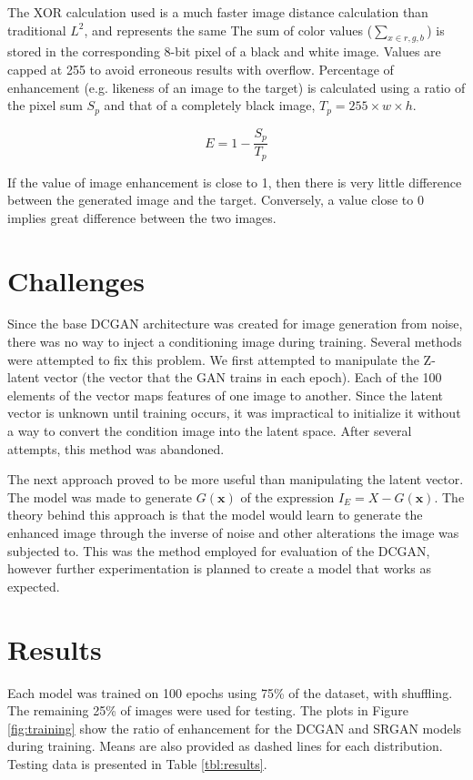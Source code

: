 \documentclass[letterpaper]{article} %
\begin{document}
The XOR calculation used is a much faster image distance calculation than
traditional $L^2$, and represents the same 
The sum of color values ($\sum_{x \in r,g,b}$) is stored in
the corresponding 8-bit pixel of a black and white image.
Values are capped at 255 to avoid erroneous results with overflow.
Percentage of enhancement (e.g. likeness of an image to the target)
is calculated using a ratio of the pixel sum $S_p$
and that of a completely black image, $T_p = 255 \times w \times h$.

\begin{equation}
\label{eq:enhancement}
E = 1 - \frac{S_p}{T_p}
\end{equation}

If the value of image enhancement
is close to 1, then there is very little difference between the generated
image and the target.
Conversely, a value close to 0 implies great difference between the two images.

\section{Challenges}
Since the base DCGAN architecture was created for image generation from noise,
there was no way to inject a conditioning image during training.
Several methods were attempted to fix this problem.
We first attempted to manipulate the Z-latent vector
(the vector that the GAN trains in each epoch).
Each of the 100 elements of the vector maps features of one image to another.
Since the latent vector is unknown until training occurs,
it was impractical to initialize it without a way to convert
the condition image into the latent space.
After several attempts, this method was abandoned.

The next approach proved to be more useful than manipulating the latent vector.
The model was made to generate $G(\mathbf{x})$ of
the expression $I_E = X - G(\mathbf{x})$. The theory behind this approach is that
the model would learn to generate the enhanced image through
the inverse of noise and other alterations the image was subjected to.
This was the method employed for evaluation of the DCGAN,
however further experimentation is planned to create a model
that works as expected.

\section{Results}
Each model was trained on 100 epochs using 75\% of the dataset, with shuffling.
The remaining 25\% of images were used for testing.
The plots in Figure \ref{fig:training} show the ratio of
enhancement for the DCGAN and SRGAN models during training.
Means are also provided as dashed lines for each distribution.
Testing data is presented in Table \ref{tbl:results}.
\end{document}
